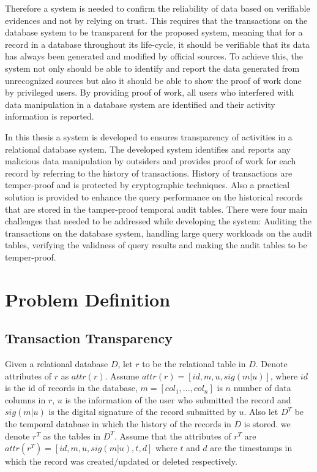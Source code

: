 Therefore a system is needed to confirm the reliability of data based on verifiable evidences and not by relying on trust. This requires that the transactions on the database system to be transparent for the proposed system, meaning that for a record in a database throughout its life-cycle, it should be verifiable that its data has always been generated and modified by official sources. To achieve this, the system not only should be able to identify and report the data generated from unrecognized sources but also it should be able to show the proof of work done by privileged users. By providing proof of work, all users who interfered with data manipulation in a database system are identified and their activity information is reported. 

In this thesis a system is developed to ensures transparency of activities in a relational database system. The developed system identifies and reports any malicious data manipulation by outsiders and provides proof of work for each record by referring to the history of transactions. History of transactions are temper-proof and is protected by cryptographic techniques. Also a practical solution is provided to enhance the query performance on the historical records that are stored in the tamper-proof temporal audit tables. There were four main challenges that needed to be addressed while developing the system: Auditing the transactions on the database system, handling large query workloads on the audit tables, verifying the validness of query results and making the audit tables to be temper-proof. 
\section{Problem Definition}
\subsection{Transaction Transparency}
Given a relational database $D$, let $r$ to be the relational table in $D$. Denote attributes of $r$ as $attr(r)$. Assume $attr(r)= [id,m,u, sig(m|u)]$, where $id$ is the id of records in the database, $m = [col_1,...,col_n]$ is $n$ number of data columns in $r$, $u$ is the information of the user who submitted the record and $sig(m|u)$ is the digital signature of the record submitted by $u$. Also let $D^T$ be the temporal database in which the history of the records in $D$ is stored. we denote $r^T$ as the tables in $D^T$. Assume that the attributes of $r^T$ are $attr(r^T) = [id,m,u,sig(m|u),t,d]$ where $t$ and $d$ are the timestamps in which the record was created/updated or deleted respectively.\\

